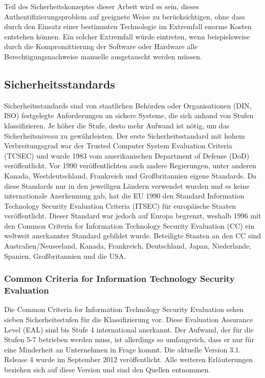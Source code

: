 \documentclass[11pt,a4paper]{report}
\begin{document}
Teil des Sicherheitskonzeptes dieser Arbeit wird es sein, dieses Authentifizierungsproblem auf geeignete Weise zu berücksichtigen, ohne dass durch den Einsatz einer bestimmten Technologie im Extremfall enorme Kosten entstehen können. Ein solcher Extremfall würde eintreten, wenn beispielsweise durch die Kompromittierung der Software oder Hardware alle Berechtigungsnachweise manuelle ausgetauscht werden müssen.

\subsection{Sicherheitsstandards} \label{sec:sec_standard}

Sicherheitsstandards sind von staatlichen Behörden oder Organisationen (DIN, ISO) festgelegte Anforderungen an sichere Systeme, die sich anhand von Stufen klassifizieren. Je höher die Stufe, desto mehr Aufwand ist nötig, um das Sicherheitsniveau zu gewährleisten. Der erste Sicherheitsstandard mit hohem Verbreitungsgrad war der Trusted Computer System Evaluation Criteria (TCSEC) und wurde 1983 vom amerikanischen Department of Defense (DoD) veröffentlicht. Vor 1990 veröffentlichten auch andere Regierungen, unter anderen Kanada, Westdeutschland, Frankreich und Großbritannien eigene Standards. Da diese Standards nur in den jeweiligen Ländern verwendet wurden und es keine internationale Anerkennung gab, hat die EU 1990 den Standard Information Technology Security Evaluation Criteria (ITSEC) für europäische Staaten veröffentlicht. Dieser Standard war jedoch auf Europa begrenzt, weshalb 1996 mit den Common Criteria for Information Technology Security Evaluation (CC) ein weltweit anerkannter Standard gebildet wurde. Beteiligte Staaten an den CC sind Australien/Neuseeland, Kanada, Frankreich, Deutschland, Japan, Niederlande, Spanien, Großbritannien und die USA.

\subsubsection{Common Criteria for Information Technology Security Evaluation}

Die Common Criteria for Information Technology Security Evaluation sehen sieben Sicherheitsstufen für die Klassifizierung vor. Diese Evaluation Assurance Level (EAL) sind bis Stufe 4 international anerkannt. Der Aufwand, der für die Stufen 5-7 betrieben werden muss, ist allerdings so umfangreich, dass er nur für eine Minderheit an Unternehmen in Frage kommt. Die aktuelle Version 3.1. Release 4 wurde im September 2012 veröffentlicht. Alle weiteren Erläuterungen beziehen sich auf diese Version und sind den Quellen \cite{ccp1, ccp2, ccp3, bsi_ccguide} entnommen.
\end{document}
